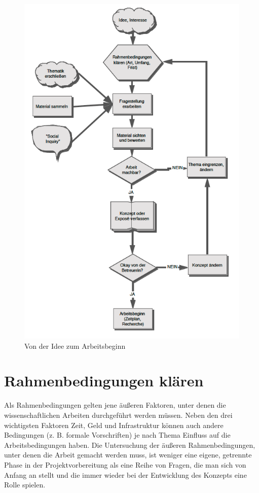 \documentclass[]{book}
\theoremstyle{definition}
\theoremstyle{definition}
\theoremstyle{definition}
\theoremstyle{remark}
\begin{document}
\begin{figure}

{\centering \includegraphics{images/konzipieren-von-idee-zum-arbeitsbeginn-min} 

}

\caption{Von der Idee zum Arbeitsbeginn}\label{fig:unnamed-chunk-2}
\end{figure}

\section{Rahmenbedingungen klären}\label{rahmenbedingungen-klaren}

Als Rahmenbedingungen gelten jene äußeren Faktoren, unter denen die
wissenschaftlichen Arbeiten durchgeführt werden müssen. Neben den drei
wichtigsten Faktoren Zeit, Geld und Infrastruktur können auch andere
Bedingungen (z. B. formale Vorschriften) je nach Thema Einfluss auf die
Arbeitsbedingungen haben. Die Untersuchung der äußeren
Rahmenbedingungen, unter denen die Arbeit gemacht werden muss, ist
weniger eine eigene, getrennte Phase in der Projektvorbereitung als eine
Reihe von Fragen, die man sich von Anfang an stellt und die immer wieder
bei der Entwicklung des Konzepts eine Rolle spielen.
\end{document}
